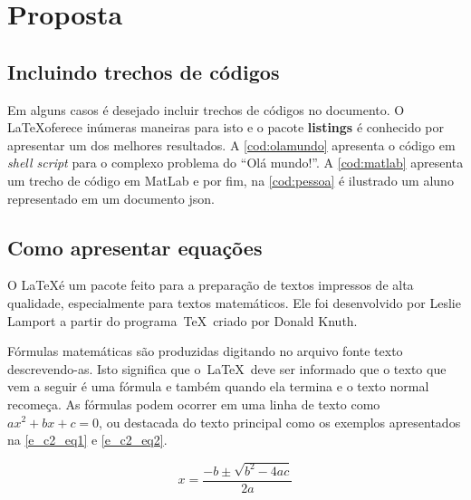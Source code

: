 \chapter{Proposta}\label{cap:proposta}


\section{Incluindo trechos de códigos}\label{sec:codigos}

Em alguns casos é desejado incluir trechos de códigos no documento. O \LaTeX oferece inúmeras maneiras para isto e o pacote \textbf{listings} é conhecido por apresentar um dos melhores resultados. A \autoref{cod:olamundo} apresenta o código em \textit{shell script} para o complexo problema do ``Olá mundo!''. A \autoref{cod:matlab} apresenta um trecho de código em MatLab e por fim, na \autoref{cod:pessoa} é ilustrado um aluno representado em um documento \gls{json}.








\section{Como apresentar equações}\label{sec:equacoes}

O \LaTeX é um pacote feito para a preparação de textos impressos de alta qualidade, especialmente
para textos matemáticos. Ele foi desenvolvido por Leslie Lamport a partir do programa~\TeX~criado por Donald Knuth.

Fórmulas matemáticas são produzidas digitando no arquivo fonte texto descrevendo-as. Isto significa que o~\LaTeX~deve ser informado que o texto que vem a seguir é uma fórmula e também quando ela termina e o texto normal recomeça. As fórmulas podem ocorrer em uma linha de texto como $ ax^2 + bx + c = 0 $, ou destacada do texto principal como os exemplos apresentados na \autoref{e_c2_eq1} e \autoref{e_c2_eq2}.

\begin{equation}
 x=\frac{-b\pm\sqrt{b^2-4ac}}{2a}
\label{e_c2_eq1}
\end{equation}

